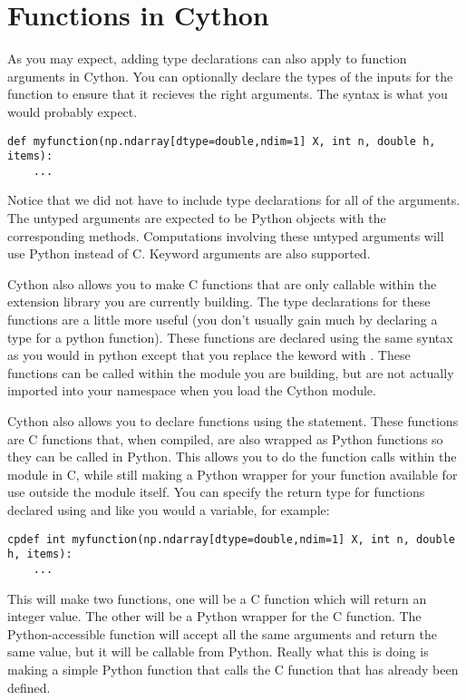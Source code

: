 \section*{Functions in Cython}

As you may expect, adding type declarations can also apply to function arguments in Cython.
You can optionally declare the types of the inputs for the function to ensure that it recieves the right arguments.
The syntax is what you would probably expect.
\begin{lstlisting}
def myfunction(np.ndarray[dtype=double,ndim=1] X, int n, double h, items):
	...
\end{lstlisting}

Notice that we did not have to include type declarations for all of the arguments.
The untyped arguments are expected to be Python objects with the corresponding methods. Computations involving these untyped arguments will use Python instead of C.
Keyword arguments are also supported.

Cython also allows you to make C functions that are only callable within the extension library you are currently building.
The type declarations for these functions are a little more useful (you don't usually gain much by declaring a type for a python function).
These functions are declared using the same syntax as you would in python except that you replace the keword  with .
These functions can be called within the module you are building, but are not actually imported into your namespace when you load the Cython module.

Cython also allows you to declare functions using the  statement.
These functions are C functions that, when compiled, are also wrapped as Python functions so they can be called in Python.
This allows you to do the function calls within the module in C, while still making a Python wrapper for your function available for use outside the module itself.
You can specify the return type for functions declared using  and  like you would a variable, for example:
\begin{lstlisting}
cpdef int myfunction(np.ndarray[dtype=double,ndim=1] X, int n, double h, items):
	...
\end{lstlisting}

This will make two functions, one will be a C function which will return an integer value.
The other will be a Python wrapper for the C function.
The Python-accessible function will accept all the same arguments and return the same value, but it will be callable from Python.
Really what this is doing is making a simple Python function that calls the C function that has already been defined.

